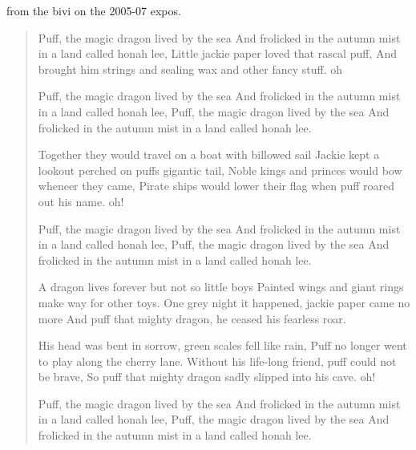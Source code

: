 from the bivi on the 2005-07 expos.

\begin{verse}
\begin{centering}
\vspace{3pt}    

\note Puff, the magic dragon lived by the sea 
\newline And frolicked in the autumn mist in a land called honah lee,
\newline Little jackie paper loved that rascal puff,
\newline And brought him strings and sealing wax and other fancy stuff. oh
\par Puff, the magic dragon lived by the sea
\newline And frolicked in the autumn mist in a land called honah lee,
\newline Puff, the magic dragon lived by the sea
\newline And frolicked in the autumn mist in a land called honah lee.
\par Together they would travel on a boat with billowed sail
\newline Jackie kept a lookout perched on puffs gigantic tail,
\newline Noble kings and princes would bow wheneer they came,
\newline Pirate ships would lower their flag when puff roared out his name. oh!
\par Puff, the magic dragon lived by the sea
\newline And frolicked in the autumn mist in a land called honah lee,
\newline Puff, the magic dragon lived by the sea
\newline And frolicked in the autumn mist in a land called honah lee.
\par A dragon lives forever but not so little boys
\newline Painted wings and giant rings make way for other toys.
\newline One grey night it happened, jackie paper came no more
\newline And puff that mighty dragon, he ceased his fearless roar.
\par His head was bent in sorrow, green scales fell like rain,
\newline Puff no longer went to play along the cherry lane.
\newline Without his life-long friend, puff could not be brave,
\newline So puff that mighty dragon sadly slipped into his cave. oh!
\par Puff, the magic dragon lived by the sea
\newline And frolicked in the autumn mist in a land called honah lee,
\newline Puff, the magic dragon lived by the sea
\newline And frolicked in the autumn mist in a land called honah lee. 


\end{centering}
\end{verse}
